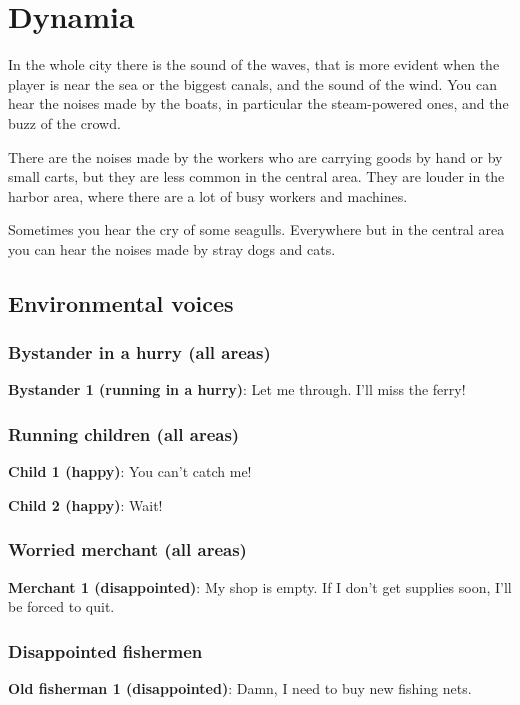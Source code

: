 \section{Dynamia}

In the whole city there is the sound of the waves, that is more evident when the player is near the sea or the biggest canals, and the sound of the wind. You can hear the noises made by the boats, in particular the steam-powered ones, and the buzz of the crowd.

There are the noises made by the workers who are carrying goods by hand or by small carts, but they are less common in the central area. They are louder in the harbor area, where there are a lot of busy workers and machines.

Sometimes you hear the cry of some seagulls. Everywhere but in the central area you can hear the noises made by stray dogs and cats.

\subsection{Environmental voices}
\subsubsection*{Bystander in a hurry (all areas)}
\textbf{Bystander 1 (running in a hurry)}: Let me through. I'll miss the ferry!

\subsubsection*{Running children (all areas)}
\textbf{Child 1 (happy)}: You can't catch me!

\textbf{Child 2 (happy)}: Wait!

\subsubsection*{Worried merchant (all areas)}
\textbf{Merchant 1 (disappointed)}: My shop is empty. If I don't get supplies soon, I'll be forced to quit.

\subsubsection*{Disappointed fishermen}
\textbf{Old fisherman 1 (disappointed)}: Damn, I need to buy new fishing nets.

